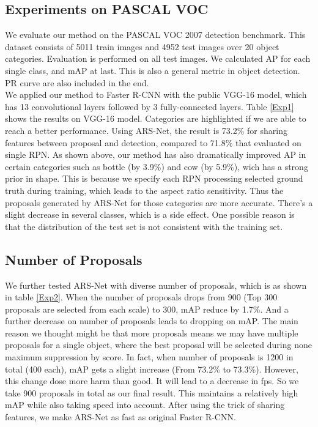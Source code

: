 \documentclass[10pt,twocolumn,letterpaper]{article}
\begin{document}
\subsection{Experiments on PASCAL VOC}
We evaluate our method on the PASCAL VOC 2007 detection benchmark. This dataset consists of 5011 train images and 4952 test images over 20 object categories. Evaluation is performed on all test images. We calculated AP for each single class, and mAP at last. This is also a general metric in object detection. PR curve are also included in the end. \\
\indent{}We applied our method to Faster R-CNN with the public VGG-16 model, which has 13 convolutional layers followed by 3 fully-connected layers. Table \ref{Exp1} shows the results on VGG-16 model. Categories are highlighted if we are able to reach a better performance. Using ARS-Net, the result is 73.2\% for sharing features between proposal and detection, compared to 71.8\% that evaluated on single RPN. As shown above, our method has also dramatically improved AP in certain categories such as bottle (by 3.9\%) and cow (by 5.9\%), wich has a strong prior in shape. This is because we specify each RPN processing selected ground truth during training, which leads to the aspect ratio sensitivity. Thus the proposals generated by ARS-Net for those categories are more accurate. There's a slight decrease in several classes, which is a side effect. One possible reason is that the distribution of the test set is not consistent with the training set.

\subsection{Number of Proposals}
We further tested ARS-Net with diverse number of proposals, which is as shown in table \ref{Exp2}. When the number of proposals drops from 900 (Top 300 proposals are selected from each scale) to 300, mAP reduce by 1.7\%. And a further decrease on number of proposals leads to dropping on mAP. The main reason we thought might be that more proposals means we may have multiple proposals for a single object, where the best proposal will be selected during none maximum suppression by score. In fact, when number of proposals is 1200 in total (400 each), mAP gets a slight increase (From 73.2\% to 73.3\%). However, this change dose more harm than good. It will lead to a decrease in fps. So we take 900 proposals in total as our final result. This maintains a relatively high mAP while also taking speed into account. After using the trick of sharing features, we make ARS-Net as fast as original Faster R-CNN.
\end{document}
